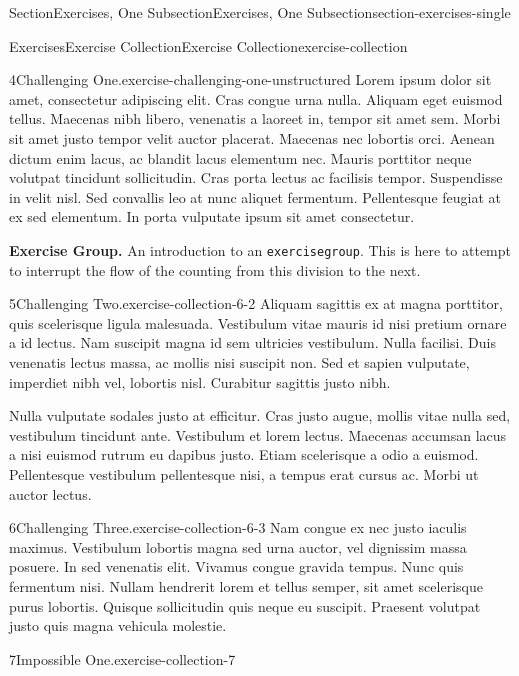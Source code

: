 \documentclass[oneside,10pt,]{article}
\newcommand{\ptxmono}[1]{\texttt{#1}}
\numberwithin{equation}{section}
\begin{document}
\begin{sectionptx}{Section}{Exercises, One Subsection}{}{Exercises, One Subsection}{}{}{section-exercises-single}
\begin{exercises-subsection-numberless}{Exercises}{Exercise Collection}{}{Exercise Collection}{}{}{exercise-collection}
\begin{divisionexercise}{4}{Challenging One.}{}{exercise-challenging-one-unstructured}
Lorem ipsum dolor sit amet, consectetur adipiscing elit. Cras congue urna nulla. Aliquam eget euismod tellus. Maecenas nibh libero, venenatis a laoreet in, tempor sit amet sem. Morbi sit amet justo tempor velit auctor placerat. Maecenas nec lobortis orci. Aenean dictum enim lacus, ac blandit lacus elementum nec. Mauris porttitor neque volutpat tincidunt sollicitudin. Cras porta lectus ac facilisis tempor. Suspendisse in velit nisl. Sed convallis leo at nunc aliquet fermentum. Pellentesque feugiat at ex sed elementum. In porta vulputate ipsum sit amet consectetur.%
\end{divisionexercise}%
\par\medskip\noindent%
\textbf{Exercise Group.}\space\space%
An introduction to an \ptxmono{exercisegroup}.  This is here to attempt to interrupt the flow of the counting from this division to the next.%
\begin{exercisegroup}
\begin{divisionexerciseeg}{5}{Challenging Two.}{}{exercise-collection-6-2}%
Aliquam sagittis ex at magna porttitor, quis scelerisque ligula malesuada. Vestibulum vitae mauris id nisi pretium ornare a id lectus. Nam suscipit magna id sem ultricies vestibulum. Nulla facilisi. Duis venenatis lectus massa, ac mollis nisi suscipit non. Sed et sapien vulputate, imperdiet nibh vel, lobortis nisl. Curabitur sagittis justo nibh.%
\par
Nulla vulputate sodales justo at efficitur. Cras justo augue, mollis vitae nulla sed, vestibulum tincidunt ante. Vestibulum et lorem lectus. Maecenas accumsan lacus a nisi euismod rutrum eu dapibus justo. Etiam scelerisque a odio a euismod. Pellentesque vestibulum pellentesque nisi, a tempus erat cursus ac. Morbi ut auctor lectus.%
\end{divisionexerciseeg}%
\begin{divisionexerciseeg}{6}{Challenging Three.}{}{exercise-collection-6-3}%
Nam congue ex nec justo iaculis maximus. Vestibulum lobortis magna sed urna auctor, vel dignissim massa posuere. In sed venenatis elit. Vivamus congue gravida tempus. Nunc quis fermentum nisi. Nullam hendrerit lorem et tellus semper, sit amet scelerisque purus lobortis. Quisque sollicitudin quis neque eu suscipit. Praesent volutpat justo quis magna vehicula molestie.%
\end{divisionexerciseeg}%
\end{exercisegroup}
\par\medskip\noindent
\begin{divisionexercise}{7}{Impossible One.}{}{exercise-collection-7}%

\end{divisionexercise}
\end{exercises-subsection-numberless}
\end{sectionptx}
\end{document}
